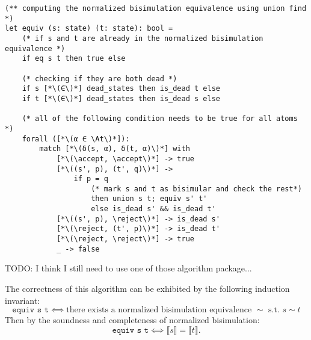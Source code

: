 \documentclass[acmsmall,screen]{acmart}
\newcommand{\At}{\mathbf{At}}
\newcommand{\reject}{\mathinner{\mathtt{Reject}}}
\newcommand{\accept}{\mathinner{\mathtt{Accept}}}
\newcommand{\theoryOf}[1]{\ensuremath{\mathsf{#1}}}
\newcommand{\BExp}{\theoryOf{BExp}}
\begin{document}
\begin{lstlisting}
(** computing the normalized bisimulation equivalence using union find *)
let equiv (s: state) (t: state): bool = 
    (* if s and t are already in the normalized bisimulation equivalence *)
    if eq s t then true else 

    (* checking if they are both dead *)
    if s [*\(∈\)*] dead_states then is_dead t else 
    if t [*\(∈\)*] dead_states then is_dead s else 
    
    (* all of the following condition needs to be true for all atoms *)
    forall ([*\(α ∈ \At\)*]): 
        match [*\(δ(s, α), δ(t, α)\)*] with 
            [*\(\accept, \accept\)*] -> true 
            [*\((s', p), (t', q)\)*] -> 
                if p = q 
                    (* mark s and t as bisimular and check the rest*)
                    then union s t; equiv s' t' 
                    else is_dead s' && is_dead t'
            [*\((s', p), \reject\)*] -> is_dead s'
            [*\(\reject, (t', p)\)*] -> is_dead t'
            [*\(\reject, \reject\)*] -> true 
            _ -> false
\end{lstlisting}
TODO: I think I still need to use one of those algorithm package... 

The correctness of this algorithm can be exhibited by the following induction invariant:
\[\texttt{equiv s t} ⟺ \text{there exists a normalized bisimulation equivalence \(∼\) s.t. \(s ∼ t\)}\]
Then by the soundness and completeness of normalized bisimulation:
\[\texttt{equiv s t} ⟺ ⟦s⟧ = ⟦t⟧.\]








\end{document}
